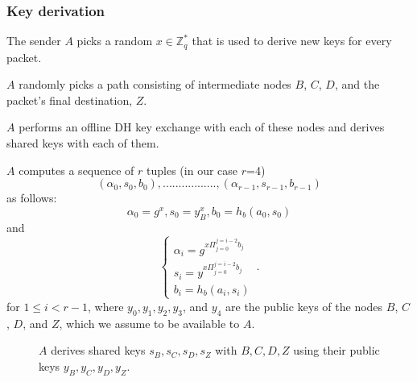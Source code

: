 \subsubsection{Key derivation}
\label{sec:sphinx:keyderivation}

The sender $A$ picks a random $x\in \mathbb{Z}^*_q$ that is used to derive new keys for every packet.

$A$ randomly picks a path consisting of intermediate nodes $B$, $C$, $D$, and the packet's final destination, $Z$.

$A$ performs an offline DH key exchange with each of these nodes and derives shared keys with each of them.

$A$ computes a sequence of $r$ tuples (in our case $r$=4)  $$(\alpha_0,s_0,b_0),.................,(\alpha_{r-1},s_{r-1},b_{r-1})$$ as follows:
$$\alpha_0=g^x,s_0=y^x_B,b_0=h_b(a_0,s_0)$$
and
\begin{equation}
    \begin{cases}
        \alpha_i=g^{x\Pi_{j=0}^{j=i-2}b_j} \\
        s_i=y^{x\Pi_{j=0}^{j=i-2}b_j}      \\
        b_i=h_b(a_i,s_i)
    \end{cases}\,.
    \label{eq:1}
\end{equation}
for $1\le i < r-1$, where $y_0,y_1, y_2, y_3$, and $y_4$ are the public keys of the nodes $B$, $C$, $D$, and $Z$, which we assume to be available to $A$.

\begin{figure}[H]
    \caption{$A$ derives shared keys $s_B,s_C,s_D,s_Z$ with $B,C,D,Z$ using their public keys $y_B,y_C,y_D,y_Z$.}
    \label{fig:sphinx:keyderivation}
\end{figure}